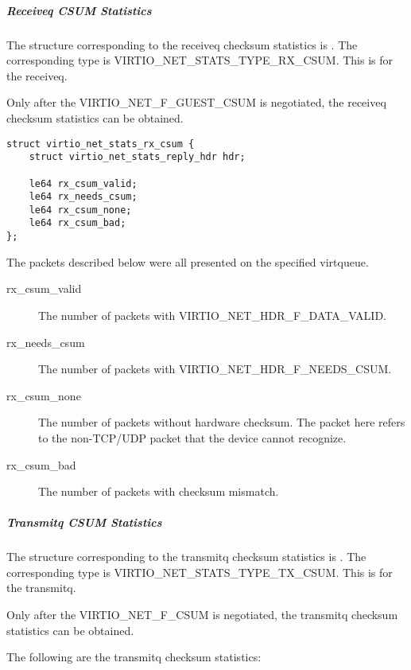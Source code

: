 \subparagraph{Receiveq CSUM Statistics}\label{sec:Device Types / Network Device / Device Operation / Control Virtqueue / Device Statistics / Receiveq CSUM Statistics}

The structure corresponding to the receiveq checksum statistics is
. The corresponding type is
VIRTIO_NET_STATS_TYPE_RX_CSUM. This is for the receiveq.

Only after the VIRTIO_NET_F_GUEST_CSUM is negotiated, the receiveq checksum
statistics can be obtained.

\begin{lstlisting}
struct virtio_net_stats_rx_csum {
    struct virtio_net_stats_reply_hdr hdr;

    le64 rx_csum_valid;
    le64 rx_needs_csum;
    le64 rx_csum_none;
    le64 rx_csum_bad;
};
\end{lstlisting}

The packets described below were all presented on the specified virtqueue.
\begin{description}
    \item [rx_csum_valid]
        The number of packets with VIRTIO_NET_HDR_F_DATA_VALID.

    \item [rx_needs_csum]
        The number of packets with VIRTIO_NET_HDR_F_NEEDS_CSUM.

    \item [rx_csum_none]
        The number of packets without hardware checksum. The packet here refers
        to the non-TCP/UDP packet that the device cannot recognize.

    \item [rx_csum_bad]
        The number of packets with checksum mismatch.

\end{description}

\subparagraph{Transmitq CSUM Statistics}\label{sec:Device Types / Network Device / Device Operation / Control Virtqueue / Device Statistics / Transmitq CSUM Statistics}

The structure corresponding to the transmitq checksum statistics is
. The corresponding type is
VIRTIO_NET_STATS_TYPE_TX_CSUM. This is for the transmitq.

Only after the VIRTIO_NET_F_CSUM is negotiated, the transmitq checksum
statistics can be obtained.

The following are the transmitq checksum statistics:

